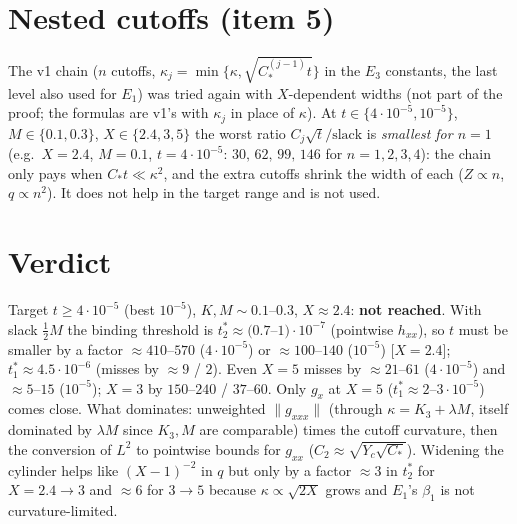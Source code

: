 \documentclass[11pt]{article}
\theoremstyle{remark}\newtheorem{remark}[theorem]{Remark}
\begin{document}
\section{Nested cutoffs (item 5)}
The v1 chain ($n$ cutoffs, $\kappa_j=\min\{\kappa,\sqrt{C_*^{(j-1)}t}\}$ in the $E_3$ constants, the last level also used for $E_1$) was tried again with $X$-dependent widths (not part of the proof; the formulas are v1's with $\kappa_j$ in place of $\kappa$). At $t\in\{4\cdot10^{-5},10^{-5}\}$, $M\in\{0.1,0.3\}$, $X\in\{2.4,3,5\}$ the worst ratio $C_j\sqrt t/\text{slack}$ is \emph{smallest for $n=1$} (e.g.\ $X=2.4$, $M=0.1$, $t=4\cdot10^{-5}$: $30,\,62,\,99,\,146$ for $n=1,2,3,4$): the chain only pays when $C_*t\ll\kappa^2$, and the extra cutoffs shrink the width of each ($Z\propto n$, $q\propto n^2$). It does not help in the target range and is not used.

\section{Verdict}
Target $t\ge4\cdot10^{-5}$ (best $10^{-5}$), $K,M\sim0.1$--$0.3$, $X\approx2.4$: \textbf{not reached}. With slack $\tfrac12M$ the binding threshold is $t_2^*\approx(0.7$--$1)\cdot10^{-7}$ (pointwise $h_{xx}$), so $t$ must be smaller by a factor $\approx410$--$570$ ($4\cdot10^{-5}$) or $\approx100$--$140$ ($10^{-5}$) [$X=2.4$]; $t_1^*\approx4.5\cdot10^{-6}$ (misses by $\approx9$ / $2$). Even $X=5$ misses by $\approx21$--$61$ ($4\cdot10^{-5}$) and $\approx5$--$15$ ($10^{-5}$); $X=3$ by $150$--$240$ / $37$--$60$. Only $g_x$ at $X=5$ ($t_1^*\approx2$--$3\cdot10^{-5}$) comes close. What dominates: unweighted $\|g_{xxx}\|$ (through $\kappa=K_3+\lambda M$, itself dominated by $\lambda M$ since $K_3,M$ are comparable) times the cutoff curvature, then the conversion of $L^2$ to pointwise bounds for $g_{xx}$ ($C_2\approx\sqrt{Y_c\sqrt{C_*}}$). Widening the cylinder helps like $(X-1)^{-2}$ in $q$ but only by a factor $\approx3$ in $t_2^*$ for $X=2.4\to3$ and $\approx6$ for $3\to5$ because $\kappa\propto\sqrt{2X}$ grows and $E_1$'s $\beta_1$ is not curvature-limited.
\end{document}
